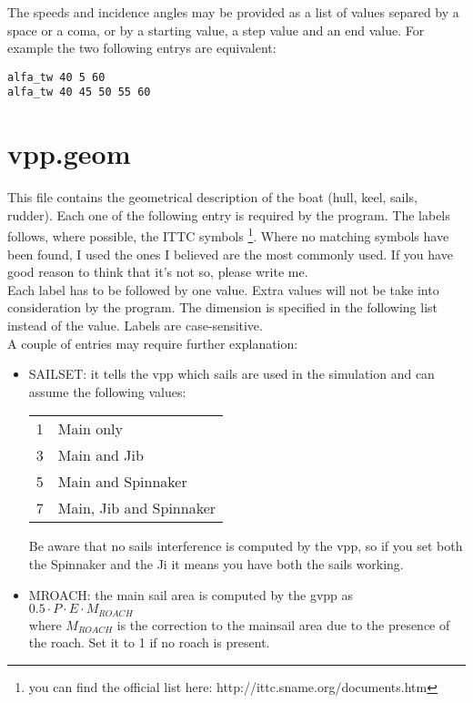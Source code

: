 \documentclass[a4paper,openany]{memoir}
\begin{document}
The speeds and incidence angles may be provided as a list of values separed by a space or a coma, or by a starting value, a step value and an end value. For example the two following entrys are equivalent:\\

\begin{center} 
  \texttt{alfa\_tw 40 5 60}\\
  \texttt{alfa\_tw 40 45 50 55 60} 
\end{center}


\section{vpp.geom}

This file contains the geometrical description of the boat (hull, keel, sails, rudder). Each one of the following entry is required by the program. The labels follows, where possible, the ITTC symbols \footnote{you can find the official list here: http://ittc.sname.org/documents.htm}. Where no matching symbols have been found, I used the ones I believed are the most commonly used. If you have good reason to think that it's not so, please write me.\\
Each label has to be followed by one value. Extra values will not be take into consideration by the program. The dimension is specified in the following list instead of the value. Labels are case-sensitive.\\
A couple of entries may require further explanation:\\
\begin{itemize}
  \item 

    SAILSET: it tells the vpp which sails are used in the simulation and can assume the following values:
    \begin{center}
      \begin{tabular}[h]{c l}
	1 & Main only \\
	3 & Main and Jib \\
	5 & Main and Spinnaker \\
	7 & Main, Jib and Spinnaker 
      \end{tabular}
    \end{center}
    Be aware that no sails interference is computed by the vpp, so if you set both the Spinnaker and the Ji it means you have both the sails working.
  \item MROACH: the main sail area is computed by the gvpp as \\ $0.5 \cdot P \cdot E \cdot M_{ROACH}$ \\
    where $M_{ROACH}$ is the correction to the mainsail area due to the presence of the roach. Set it to 1 if no roach is present.
\end{itemize}
\end{document}
